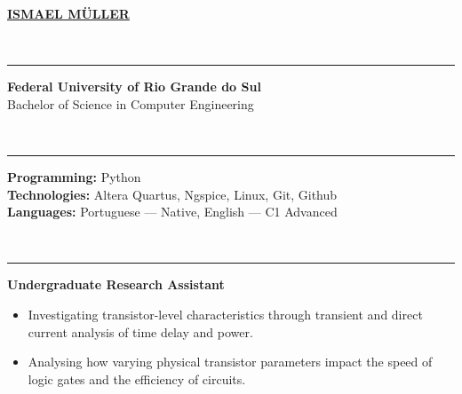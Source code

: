 \documentclass[10pt,a4paper]{article}
\begin{document}
\pagestyle{empty}

\begin{center}
\fontsize{12pt}{15pt}\selectfont\textbf{\href{https://www.linkedin.com/in/ismael-mueller}{ISMAEL MÜLLER}}
\end{center}

\vspace{0.5em}

\vspace{-0.6em}\\
\rule{\textwidth}{0.5pt}

\vspace{0.5em}

\noindent\textbf{Federal University of Rio Grande do Sul}\hfill{}\\
\noindent Bachelor of Science in Computer Engineering

\vspace{10pt}

\vspace{-0.6em}\\
\rule{\textwidth}{0.5pt}

\vspace{0.5em}

\noindent\textbf{Programming:} Python\\
\noindent\textbf{Technologies:} Altera Quartus, Ngspice, Linux, Git, Github\\
\noindent\textbf{Languages:} Portuguese --- Native, English --- C1 Advanced

\vspace{10pt}

\vspace{-0.6em}\\
\rule{\textwidth}{0.5pt}

\vspace{0.5em}

\noindent\textbf{Undergraduate Research Assistant}\hfill{}\vspace{-0.5em}
\begin{itemize}[leftmargin=*]
\setlength\itemsep{0pt}
\setlength\parskip{0pt}
\setlength\parfillskip{0pt}
\item Investigating transistor-level characteristics through transient and direct current analysis of time delay and power.
\item Analysing how varying physical transistor parameters impact the speed of logic gates and the efficiency of circuits.
\end{itemize}
\end{document}
